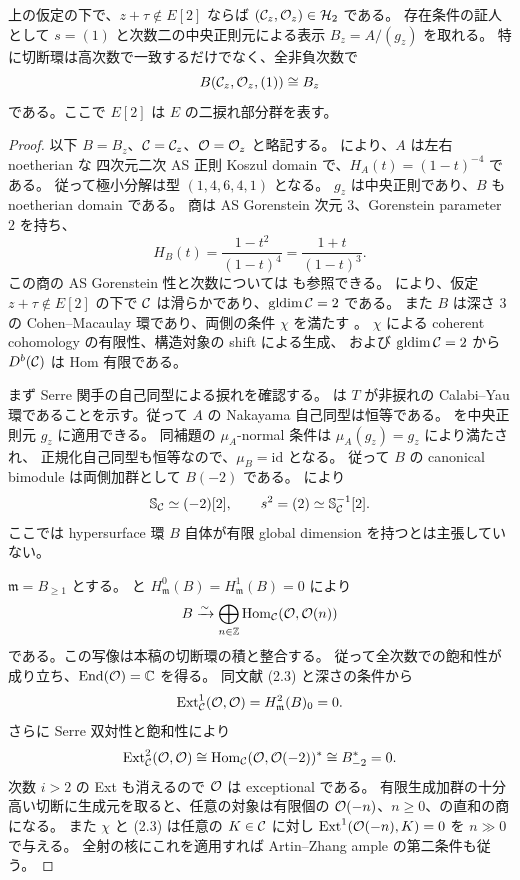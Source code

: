 \begin{proposition}[滑らかな楕円型の対象]
\label{prop:sklyanin-h2}
上の仮定の下で、$z+\tau\notin E[2]$ ならば
$(\mathcal C_z,\mathcal O_z)\in\mathcal H_2$ である。
存在条件の証人として $s=(1)$ と次数二の中央正則元による表示 $B_z=A/(g_z)$ を取れる。
特に切断環は高次数で一致するだけでなく、全非負次数で
\[
 B(\mathcal C_z,\mathcal O_z,(1))\cong B_z
\]
である。ここで $E[2]$ は $E$ の二捩れ部分群を表す。
\end{proposition}

\begin{proof}
以下 $B=B_z$、$\mathcal C=\mathcal C_z$、$\mathcal O=\mathcal O_z$ と略記する。
\cite[\S\S 10.1--10.2]{SVdB2013} により、$A$ は左右 noetherian な
四次元二次 AS 正則 Koszul domain で、$H_A(t)=(1-t)^{-4}$ である。
従って極小分解は型 $(1,4,6,4,1)$ となる。
$g_z$ は中央正則であり、$B$ も noetherian domain である。
商は AS Gorenstein 次元 $3$、Gorenstein parameter $2$ を持ち、
\[
 H_B(t)=\frac{1-t^2}{(1-t)^4}=\frac{1+t}{(1-t)^3}.
\]
この商の AS Gorenstein 性と次数については
\cite[\S 5, Definition 5.1 直後]{MU2021} も参照できる。
\cite[Theorem 10.2]{SVdB2013} により、仮定 $z+\tau\notin E[2]$ の下で
$\mathcal C$ は滑らかであり、$\operatorname{gldim}\mathcal C=2$ である。
また $B$ は深さ $3$ の Cohen--Macaulay 環であり、両側の条件 $\chi$ を満たす
\cite[\S\S 2.5--2.8]{SVdB2013}。
$\chi$ による coherent cohomology の有限性、構造対象の shift による生成、
および $\operatorname{gldim}\mathcal C=2$ から $D^b(\mathcal C)$ は Hom 有限である。

まず Serre 関手の自己同型による捩れを確認する。
\cite[arXiv v3, Proposition 7.1]{BSW2010} は $T$ が非捩れの
Calabi--Yau 環であることを示す。従って $A$ の Nakayama 自己同型は恒等である。
\cite[arXiv v2, Lemma 1.5]{RRZ2014} を中央正則元 $g_z$ に適用できる。
同補題の $\mu_A$-normal 条件は $\mu_A(g_z)=g_z$ により満たされ、
正規化自己同型も恒等なので、$\mu_B=\mathrm{id}$ となる。
従って $B$ の canonical bimodule は両側加群として $B(-2)$ である。
\cite[Example 3.6(2) および \S 5 の Proposition 5.2 直後]{MU2021} により
\[
 \mathbb S_{\mathcal C}\simeq(-2)[2],\qquad
 s^2=(2)\simeq\mathbb S_{\mathcal C}^{-1}[2].
\]
ここでは hypersurface 環 $B$ 自体が有限 global dimension を持つとは主張していない。

$\mathfrak m=B_{\ge1}$ とする。
\cite[(2.2)]{SVdB2013} と $H^0_{\mathfrak m}(B)=H^1_{\mathfrak m}(B)=0$ により
\[
 B\xrightarrow{\sim}
 \bigoplus_{n\in\mathbb Z}\operatorname{Hom}_{\mathcal C}(\mathcal O,\mathcal O(n))
\]
である。この写像は本稿の切断環の積と整合する。
従って全次数での飽和性が成り立ち、$\operatorname{End}(\mathcal O)=\mathbb C$ を得る。
同文献 (2.3) と深さの条件から
\[
 \operatorname{Ext}^1_{\mathcal C}(\mathcal O,\mathcal O)=H^2_{\mathfrak m}(B)_0=0.
\]
さらに Serre 双対性と飽和性により
\[
 \operatorname{Ext}^2_{\mathcal C}(\mathcal O,\mathcal O)
 \cong\operatorname{Hom}_{\mathcal C}(\mathcal O,\mathcal O(-2))^*
 \cong B_{-2}^*=0.
\]
次数 $i>2$ の Ext も消えるので $\mathcal O$ は exceptional である。
有限生成加群の十分高い切断に生成元を取ると、任意の対象は有限個の
$\mathcal O(-n)$、$n\ge0$、の直和の商になる。
また $\chi$ と (2.3) は任意の $K\in\mathcal C$ に対し
$\operatorname{Ext}^1(\mathcal O(-n),K)=0$ を $n\gg0$ で与える。
全射の核にこれを適用すれば Artin--Zhang ample の第二条件も従う。


\end{proof}
